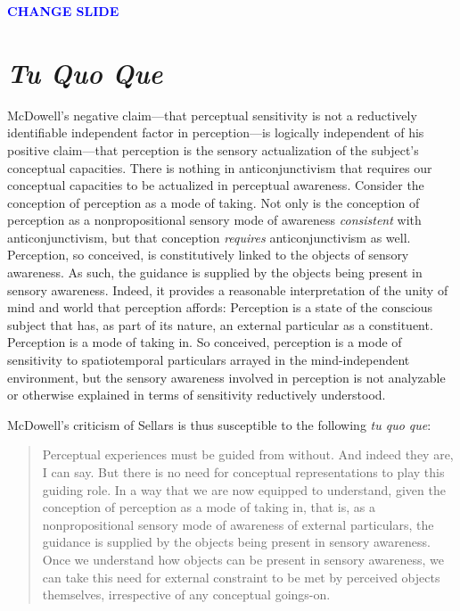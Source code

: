 \documentclass[12pt]{article}
\newcommand{\change}{\textcolor{blue}{\textbf{CHANGE SLIDE}}}
\begin{document}
\change


\section{\emph{Tu Quo Que}} %
\label{sec:tu_quo_que}

McDowell's negative claim---that perceptual sensitivity is not a reductively identifiable independent factor in perception---is logically independent of his positive claim---that perception is the sensory actualization of the subject's conceptual capacities. There is nothing in anticonjunctivism that requires our conceptual capacities to be actualized in perceptual awareness. Consider the conception of perception as a mode of taking. Not only is the conception of perception as a nonpropositional sensory mode of awareness \emph{consistent} with anticonjunctivism, but that conception \emph{requires} anticonjunctivism as well. Perception, so conceived, is constitutively linked to the objects of sensory awareness. As such, the guidance is supplied by the objects being present in sensory awareness. Indeed, it provides a reasonable interpretation of the unity of mind and world that perception affords: Perception is a state of the conscious subject that has, as part of its nature, an external particular as a constituent. Perception is a mode of taking in. So conceived, perception is a mode of sensitivity to spatiotemporal particulars arrayed in the mind-independent environment, but the sensory awareness involved in perception is not analyzable or otherwise explained in terms of sensitivity reductively understood.

McDowell's criticism of Sellars is thus susceptible to the following \emph{tu quo que}: 
\begin{quote}
    Perceptual experiences must be guided from without. And indeed they are, I can say. But there is no need for conceptual representations to play this guiding role. In a way that we are now equipped to understand, given the conception of perception as a mode of taking in, that is, as a nonpropositional sensory mode of awareness of external particulars, the guidance is supplied by the objects being present in sensory awareness. Once we understand how objects can be present in sensory awareness, we can take this need for external constraint to be met by perceived objects themselves, irrespective of any conceptual goings-on.
\end{quote}
\end{document}
